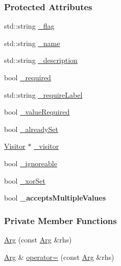 \subsubsection*{Protected Attributes}
\begin{DoxyCompactItemize}
\item 
std\+::string \hyperlink{classTCLAP_1_1Arg_ae68407a0a8223023ad0ae3b9dc7986f5}{\+\_\+flag}
\item 
std\+::string \hyperlink{classTCLAP_1_1Arg_ac0f138057a99fb5d94ff4acb41a083aa}{\+\_\+name}
\item 
std\+::string \hyperlink{classTCLAP_1_1Arg_a9882fe256eaab01ac53db54ac657d272}{\+\_\+description}
\item 
bool \hyperlink{classTCLAP_1_1Arg_ad16408bd1ca4d8b1d14d6c5129545a84}{\+\_\+required}
\item 
std\+::string \hyperlink{classTCLAP_1_1Arg_a2ed097a868e34a0c4f6062ead744ac54}{\+\_\+require\+Label}
\item 
bool \hyperlink{classTCLAP_1_1Arg_a776682b7e19f4dc231bbad3d10034dfa}{\+\_\+value\+Required}
\item 
bool \hyperlink{classTCLAP_1_1Arg_a829e32129857d2683e5791a5df1208ec}{\+\_\+already\+Set}
\item 
\hyperlink{classTCLAP_1_1Visitor}{Visitor} $\ast$ \hyperlink{classTCLAP_1_1Arg_aa9ff037e92c9fa5bd85e532f61899300}{\+\_\+visitor}
\item 
bool \hyperlink{classTCLAP_1_1Arg_a9832bb7564f4ab472bd51b7b1bbc683f}{\+\_\+ignoreable}
\item 
bool \hyperlink{classTCLAP_1_1Arg_ab413bd1d8a7ecf3c89672ee23ef791ba}{\+\_\+xor\+Set}
\item 
bool {\bfseries \+\_\+accepts\+Multiple\+Values}\hypertarget{classTCLAP_1_1Arg_a13130a9a5d22c57a6d42a8883c9b1e0f}{}\label{classTCLAP_1_1Arg_a13130a9a5d22c57a6d42a8883c9b1e0f}

\end{DoxyCompactItemize}
\subsubsection*{Private Member Functions}
\begin{DoxyCompactItemize}
\item 
\hyperlink{classTCLAP_1_1Arg_aca23d0f3bd09d71f22dbe8f4504c04dc}{Arg} (const \hyperlink{classTCLAP_1_1Arg}{Arg} \&rhs)
\item 
\hyperlink{classTCLAP_1_1Arg}{Arg} \& \hyperlink{classTCLAP_1_1Arg_a580ebe03ce3af1f85db2b2e5d19fb6bc}{operator=} (const \hyperlink{classTCLAP_1_1Arg}{Arg} \&rhs)
\end{DoxyCompactItemize}
